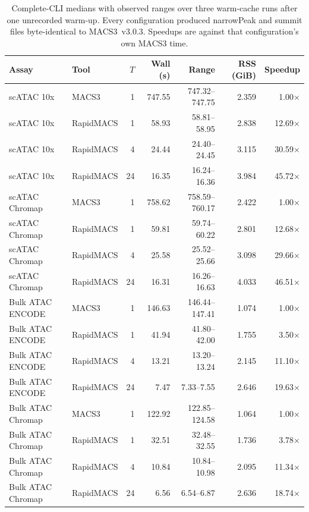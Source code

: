 \documentclass[10pt]{article}
\begin{document}
\begin{table}[h]
\centering
\small
\caption{Complete-CLI medians with observed ranges over three warm-cache runs after one unrecorded warm-up. Every configuration produced narrowPeak and summit files byte-identical to MACS3~v3.0.3. Speedups are against that configuration's own MACS3 time.\label{tab:s3}}
\begin{tabular}{@{}llrrrrr@{}}
\toprule
\textbf{Assay} & \textbf{Tool} & \textbf{$T$} & \textbf{Wall (s)} & \textbf{Range} & \textbf{RSS (GiB)} & \textbf{Speedup} \\
\midrule
scATAC 10x     & MACS3     & 1  & 747.55 & 747.32--747.75 & 2.359 & 1.00$\times$ \\
scATAC 10x     & RapidMACS & 1  &  58.93 &  58.81--58.95  & 2.838 & 12.69$\times$ \\
scATAC 10x     & RapidMACS & 4  &  24.44 &  24.40--24.45  & 3.115 & 30.59$\times$ \\
scATAC 10x     & RapidMACS & 24 &  16.35 &  16.24--16.36  & 3.984 & 45.72$\times$ \\
\addlinespace
scATAC Chromap & MACS3     & 1  & 758.62 & 758.59--760.17 & 2.422 & 1.00$\times$ \\
scATAC Chromap & RapidMACS & 1  &  59.81 &  59.74--60.22  & 2.801 & 12.68$\times$ \\
scATAC Chromap & RapidMACS & 4  &  25.58 &  25.52--25.66  & 3.098 & 29.66$\times$ \\
scATAC Chromap & RapidMACS & 24 &  16.31 &  16.26--16.63  & 4.033 & 46.51$\times$ \\
\addlinespace
Bulk ATAC ENCODE  & MACS3     & 1  & 146.63 & 146.44--147.41 & 1.074 & 1.00$\times$ \\
Bulk ATAC ENCODE  & RapidMACS & 1  &  41.94 &  41.80--42.00  & 1.755 & 3.50$\times$ \\
Bulk ATAC ENCODE  & RapidMACS & 4  &  13.21 &  13.20--13.24  & 2.145 & 11.10$\times$ \\
Bulk ATAC ENCODE  & RapidMACS & 24 &   7.47 &   7.33--7.55   & 2.646 & 19.63$\times$ \\
\addlinespace
Bulk ATAC Chromap & MACS3     & 1  & 122.92 & 122.85--124.58 & 1.064 & 1.00$\times$ \\
Bulk ATAC Chromap & RapidMACS & 1  &  32.51 &  32.48--32.55  & 1.736 & 3.78$\times$ \\
Bulk ATAC Chromap & RapidMACS & 4  &  10.84 &  10.84--10.98  & 2.095 & 11.34$\times$ \\
Bulk ATAC Chromap & RapidMACS & 24 &   6.56 &   6.54--6.87   & 2.636 & 18.74$\times$ \\

\end{tabular}
\end{table}
\end{document}
